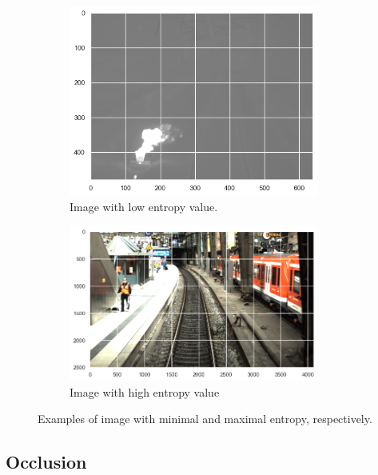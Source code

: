 \documentclass[Master,MDS,english]{BASE/twbook} %
\begin{document}
\begin{figure}
\centering
\begin{subfigure}[t]{.5\textwidth}
  \centering
  \includegraphics[width=0.9\textwidth]{images/datasets/db/low_entropy}
  \caption{Image with low entropy value.}
  \label{fig:entropy_sub1}
\end{subfigure}%
\begin{subfigure}[t]{.5\textwidth}
  \centering
  \includegraphics[width=0.9\textwidth]{images/datasets/db/high_entropy}
  \caption{Image with high entropy value}
 \label{fig:entropy_sub2}
\end{subfigure}
\caption{Examples of image with minimal and maximal entropy, respectively.}
\label{fig:entropy_examples}
\end{figure}


\subsection{Occlusion}
\end{document}
